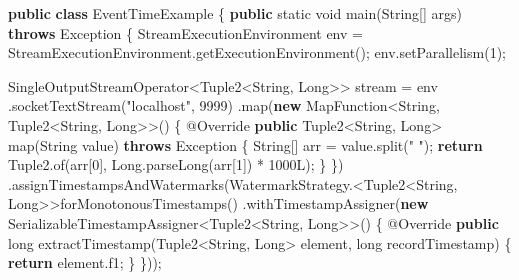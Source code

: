 \documentclass[cn,11pt,chinese]{elegantbook}
\newenvironment{Shaded}{}{}
\newcommand{\AttributeTok}[1]{\textcolor[rgb]{0.49,0.56,0.16}{#1}}
\newcommand{\BuiltInTok}[1]{#1}
\newcommand{\DataTypeTok}[1]{\textcolor[rgb]{0.56,0.13,0.00}{#1}}
\newcommand{\DecValTok}[1]{\textcolor[rgb]{0.25,0.63,0.44}{#1}}
\newcommand{\FunctionTok}[1]{\textcolor[rgb]{0.02,0.16,0.49}{#1}}
\newcommand{\KeywordTok}[1]{\textcolor[rgb]{0.00,0.44,0.13}{\textbf{#1}}}
\newcommand{\NormalTok}[1]{#1}
\newcommand{\StringTok}[1]{\textcolor[rgb]{0.25,0.44,0.63}{#1}}
\begin{document}
\begin{Shaded}
\begin{Highlighting}[]
\KeywordTok{public} \KeywordTok{class}\NormalTok{ EventTimeExample \{}
    \KeywordTok{public} \DataTypeTok{static} \DataTypeTok{void} \FunctionTok{main}\NormalTok{(}\BuiltInTok{String}\NormalTok{[] args) }\KeywordTok{throws} \BuiltInTok{Exception}\NormalTok{ \{}
\NormalTok{        StreamExecutionEnvironment env = StreamExecutionEnvironment.}\FunctionTok{getExecutionEnvironment}\NormalTok{();}
\NormalTok{        env.}\FunctionTok{setParallelism}\NormalTok{(}\DecValTok{1}\NormalTok{);}

\NormalTok{        SingleOutputStreamOperator\textless{}Tuple2\textless{}}\BuiltInTok{String}\NormalTok{, }\BuiltInTok{Long}\NormalTok{\textgreater{}\textgreater{} stream = env}
\NormalTok{                .}\FunctionTok{socketTextStream}\NormalTok{(}\StringTok{"localhost"}\NormalTok{, }\DecValTok{9999}\NormalTok{)}
\NormalTok{                .}\FunctionTok{map}\NormalTok{(}\KeywordTok{new}\NormalTok{ MapFunction\textless{}}\BuiltInTok{String}\NormalTok{, Tuple2\textless{}}\BuiltInTok{String}\NormalTok{, }\BuiltInTok{Long}\NormalTok{\textgreater{}\textgreater{}() \{}
                    \AttributeTok{@Override}
                    \KeywordTok{public}\NormalTok{ Tuple2\textless{}}\BuiltInTok{String}\NormalTok{, }\BuiltInTok{Long}\NormalTok{\textgreater{} }\FunctionTok{map}\NormalTok{(}\BuiltInTok{String}\NormalTok{ value) }\KeywordTok{throws} \BuiltInTok{Exception}\NormalTok{ \{}
                        \BuiltInTok{String}\NormalTok{[] arr = value.}\FunctionTok{split}\NormalTok{(}\StringTok{" "}\NormalTok{);}
                        \KeywordTok{return}\NormalTok{ Tuple2.}\FunctionTok{of}\NormalTok{(arr[}\DecValTok{0}\NormalTok{], }\BuiltInTok{Long}\NormalTok{.}\FunctionTok{parseLong}\NormalTok{(arr[}\DecValTok{1}\NormalTok{]) * }\DecValTok{1000L}\NormalTok{);}
\NormalTok{                    \}}
\NormalTok{                \})}
\NormalTok{                .}\FunctionTok{assignTimestampsAndWatermarks}\NormalTok{(WatermarkStrategy.\textless{}Tuple2\textless{}}\BuiltInTok{String}\NormalTok{, }\BuiltInTok{Long}\NormalTok{\textgreater{}\textgreater{}}\FunctionTok{forMonotonousTimestamps}\NormalTok{()}
\NormalTok{                        .}\FunctionTok{withTimestampAssigner}\NormalTok{(}\KeywordTok{new}\NormalTok{ SerializableTimestampAssigner\textless{}Tuple2\textless{}}\BuiltInTok{String}\NormalTok{, }\BuiltInTok{Long}\NormalTok{\textgreater{}\textgreater{}() \{}
                            \AttributeTok{@Override}
                            \KeywordTok{public} \DataTypeTok{long} \FunctionTok{extractTimestamp}\NormalTok{(Tuple2\textless{}}\BuiltInTok{String}\NormalTok{, }\BuiltInTok{Long}\NormalTok{\textgreater{} element, }\DataTypeTok{long}\NormalTok{ recordTimestamp) \{}
                                \KeywordTok{return}\NormalTok{ element.}\FunctionTok{f1}\NormalTok{;}
\NormalTok{                            \}}
\NormalTok{                        \}));}


\end{Highlighting}
\end{Shaded}
\end{document}
